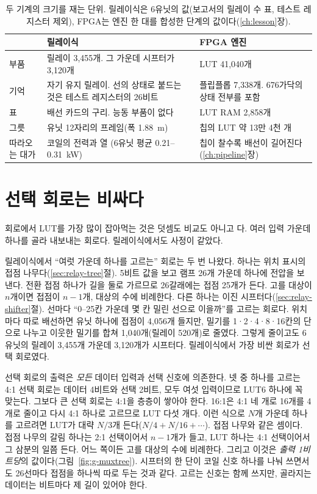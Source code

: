 \begin{table}[ht]
\centering
\caption{두 기계의 크기를 재는 단위. 릴레이식은 6유닛의 값(보고서의 릴레이 수 표, 테스트 레지스터 제외), FPGA는
엔진 한 대를 합성한 단계의 값이다(\ref{ch:lesson}장).}
\label{tab:g-res-count}
\small
\begin{tabularx}{\linewidth}{l >{\raggedright\arraybackslash}X >{\raggedright\arraybackslash}X}
\toprule
& 릴레이식 & FPGA 엔진 \\
\midrule
부품 & 릴레이 3,455개. 그 가운데 시프터가 3,120개 & LUT 41,040개 \\
기억 & 자기 유지 릴레이. 선의 상태로 붙드는 것은 테스트 레지스터의 26비트 & 플립플롭 7,338개. 676가닥의 상태 전부를 포함 \\
표 & 배선 카드의 구리. 능동 부품이 없다 & LUT RAM 2,858개 \\
그릇 & 유닛 12자리의 프레임(폭 1.88~m) & 칩의 LUT 약 13만 4천 개 \\
따라오는 대가 & 코일의 전력과 열 (6유닛 평균 0.21--0.31~kW) & 칩이 찰수록 배선이 길어진다 (\ref{ch:pipeline}장) \\
\bottomrule
\end{tabularx}
\end{table}

\section{선택 회로는 비싸다}\label{sec:mux-cost}

회로에서 LUT를 가장 많이 잡아먹는 것은 덧셈도 비교도 아니고 다.
여러 입력 가운데 하나를 골라 내보내는 회로다. 릴레이식에서도 사정이 같았다.

\Relay 릴레이식에서 ``여럿 가운데 하나를 고르는'' 회로는 두 번 나왔다. 하나는 위치 표시의 접점
나무다(\ref{sec:relay-tree}절). 5비트 값을 보고 램프 26개 가운데 하나에 전압을 보낸다. 전환 접점 하나가 길을
둘로 가르므로 26갈래에는 접점 25개가 든다. 고를 대상이 $n$개이면 접점이 $n-1$개, 대상의 수에 비례한다. 다른
하나는 이진 시프터다(\ref{sec:relay-shifter}절). 선마다 ``0--25칸 가운데 몇 칸 밀린 선으로 이을까''를 고르는 회로다.
위치마다 따로 배선하면 유닛 하나에 접점이 4,056개 들지만, 밀기를 1·2·4·8·16칸의 단으로 나누고 이웃한 밀기를
합쳐 1,040개(릴레이 520개)로 줄였다. 그렇게 줄이고도 6유닛의 릴레이 3,455개 가운데 3,120개가 시프터다.
릴레이식에서 가장 비싼 회로가 선택 회로였다.

\Why 선택 회로의 출력은 \emph{모든} 데이터 입력과 선택 신호에 의존한다. 넷 중 하나를 고르는 4:1 선택
회로는 데이터 4비트와 선택 2비트, 모두 여섯 입력이므로 LUT6 하나에 꼭 맞는다. 그보다 큰 선택 회로는
4:1을 층층이 쌓아야 한다. 16:1은 4:1 네 개로 16개를 4개로 줄이고 다시 4:1 하나로 고르므로 LUT 다섯 개다.
이런 식으로 $N$개 가운데 하나를 고르려면 LUT가 대략 $N/3$개 든다($N/4 + N/16 + \cdots$). 접점 나무와 같은
셈이다. 접점 나무의 갈림 하나는 2:1 선택이어서 $n-1$개가 들고, LUT 하나는 4:1 선택이어서 그 삼분의 일쯤 든다.
어느 쪽이든 고를 대상의 수에 비례한다. 그리고 이것은 \emph{출력 1비트당}의 값이다(그림~\ref{fig:g-muxtree}).
시프터의 한 단이 코일 신호 하나를 나눠 쓰면서도 26선마다 접점을 하나씩 따로 두는 것과 같다. 고르는 신호는
함께 쓰지만, 골라지는 데이터는 비트마다 제 길이 있어야 한다.

